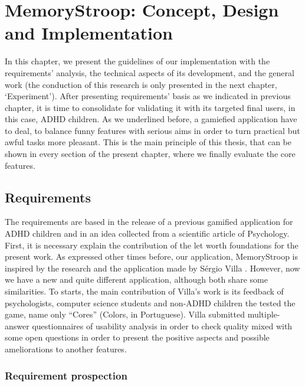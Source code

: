 \chapter{MemoryStroop: Concept, Design and Implementation}
\label{ch:desenvolvimento}

In this chapter, we present the guidelines of our implementation with the requirements' analysis, the technical aspects of its development, and the general work  (the conduction of this research is only presented in the next chapter, `Experiment'). After presenting requirements' basis as we indicated in previous chapter, it is time to consolidate for validating it with its targeted final users, in this case, ADHD children. As we underlined before, a gamiefied application have to deal, to balance funny features with serious aims in order to turn practical but awful tasks more pleasant. This is the main principle of this thesis, that can be shown in every section of the present chapter, where we finally evaluate the core features.

\section{Requirements}

The requirements are based in the release of a previous gamified  application for ADHD children and in an idea collected from a scientific article of Psychology. First, it is necessary explain the contribution of the let worth foundations for the present work. As expressed other times before, our application, MemoryStroop is inspired by the research and the application made by S\'{e}rgio Villa \citep{Villa}. However, now we have a new and quite different application, although both share some similarities. To starts, the main contribution of Villa's work is its feedback of psychologists, computer science students and non-ADHD children the tested the game, name only ``Cores'' (Colors, in Portuguese). Villa submitted multiple-answer questionnaires of usability analysis in order to check quality mixed with some open questions in order to present the positive aspects and possible ameliorations to another features. 

\subsection{Requirement prospection}

